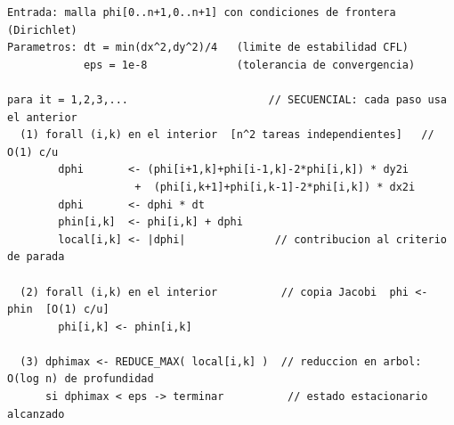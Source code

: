 \documentclass[11pt,a4paper]{article}
\begin{document}
	\begin{lstlisting}[style=cppstyle, language={}, caption={Algoritmo PRAM de una iteración del solver.}, label={lst:pram}]
Entrada: malla phi[0..n+1,0..n+1] con condiciones de frontera (Dirichlet)
Parametros: dt = min(dx^2,dy^2)/4   (limite de estabilidad CFL)
            eps = 1e-8              (tolerancia de convergencia)

para it = 1,2,3,...                      // SECUENCIAL: cada paso usa el anterior
  (1) forall (i,k) en el interior  [n^2 tareas independientes]   // O(1) c/u
        dphi       <- (phi[i+1,k]+phi[i-1,k]-2*phi[i,k]) * dy2i
                    +  (phi[i,k+1]+phi[i,k-1]-2*phi[i,k]) * dx2i
        dphi       <- dphi * dt
        phin[i,k]  <- phi[i,k] + dphi
        local[i,k] <- |dphi|              // contribucion al criterio de parada

  (2) forall (i,k) en el interior          // copia Jacobi  phi <- phin  [O(1) c/u]
        phi[i,k] <- phin[i,k]

  (3) dphimax <- REDUCE_MAX( local[i,k] )  // reduccion en arbol: O(log n) de profundidad
      si dphimax < eps -> terminar          // estado estacionario alcanzado
	\end{lstlisting}
\end{document}
